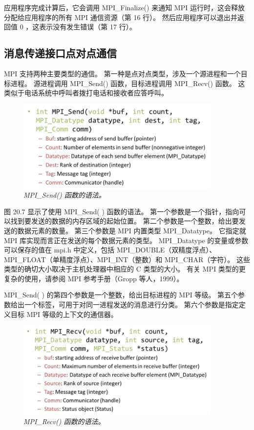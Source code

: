 应用程序完成计算后，它会调用 MPI\_Finalize() 来通知 MPI 运行时，这会释放分配给应用程序的所有 MPI 通信资源（第 16 行）。 
然后应用程序可以退出并返回值 0 ，这表示没有发生错误（第 17 行）。

\subsection{消息传递接口点对点通信}
MPI 支持两种主要类型的通信。 第一种是点对点类型，涉及一个源进程和一个目标进程。 
源进程调用 MPI\_Send() 函数，目标进程调用 MPI\_Recv() 函数。 这类似于电话系统中呼叫者拨打电话和接收者应答呼叫。

\begin{figure}[H]
	\centering
	\includegraphics[width=0.9\textwidth]{figs/F20.7.png}
	\caption{\textit{MPI\_Send() 函数的语法。}}
\end{figure}

图 20.7 显示了使用 MPI\_Send( ) 函数的语法。 第一个参数是一个指针，指向可以找到要发送的数据的内存区域的起始位置。 
第二个参数是一个整数，给出要发送的数据元素的数量。 第三个参数是 MPI 内置类型 MPI\_Datatype。 
它指定就 MPI 库实现而言正在发送的每个数据元素的类型。 
MPI\_Datatype 的变量或参数可以保存的值在 mpi.h 中定义，包括 MPI\_DOUBLE（双精度浮点）、
MPI\_FLOAT（单精度浮点）、MPI\_INT（整数）和 MPI\_CHAR（字符）。 
这些类型的确切大小取决于主机处理器中相应的 $\mathrm{C}$ 类型的大小。 
有关 MPI 类型的更复杂的使用，请参阅 MPI 参考手册（Gropp 等人，1999）。

MPI\_Send( ) 的第四个参数是一个整数，给出目标进程的 MPI 等级。 
第五个参数给出一个标签，可用于对同一进程发送的消息进行分类。 第六个参数是指定定义目标 MPI 等级的上下文的通信器。

\begin{figure}[H]
	\centering
	\includegraphics[width=0.9\textwidth]{figs/F20.8.png}
	\caption{\textit{MPI\_Recv() 函数的语法。}}
\end{figure}

